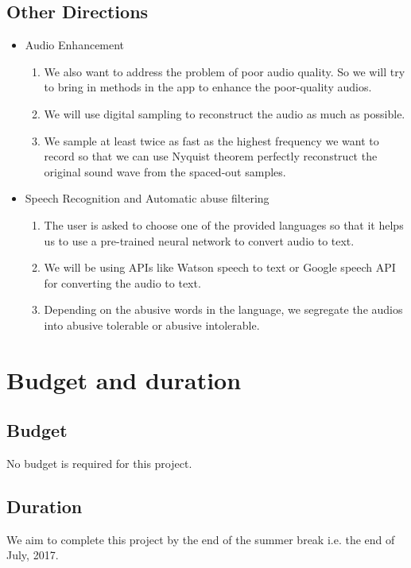 \documentclass[11pt]{article}
\begin{document}
		\subsection{Other Directions}
		\begin{itemize}
		    \item Audio Enhancement
                \begin{enumerate}
                \item We also want to address the problem of poor audio quality. So we will try to bring in methods in the app to enhance the poor-quality audios.
                    \item We will use digital sampling to reconstruct the audio as much as possible.
                    \item We sample at least twice as fast as the highest frequency we want to record so that we can use Nyquist theorem perfectly reconstruct the original sound wave from the spaced-out samples.
                \end{enumerate} 
                
            \item Speech Recognition and Automatic abuse filtering
            \begin{enumerate}
                \item The user is asked to choose one of the provided languages so that it helps us to use a pre-trained neural network to convert audio to text.
                \item We will be using APIs like Watson speech to text or Google speech API for converting the audio to text.
                \item Depending on the abusive words in the language, we segregate the audios into abusive tolerable or abusive intolerable.
            \end{enumerate}
                
		\end{itemize}
		
	\section{Budget and duration}	
		\subsection{Budget}
			No budget is required for this project.			
					
		\subsection{Duration}
			We aim to complete this project by the end of the summer break i.e. the end of July, 2017. 
\end{document}
